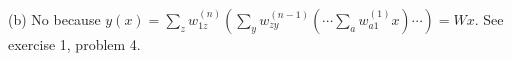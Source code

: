 \begin{enumerate}
\begin{solution}
    \vspace{0.5cm}
    (b) No because $y(x)=\sum_z w_{1z}^{(n)}\left(\sum_y
      w_{zy}^{(n-1)}\left(\dotsm \sum_a w_{a1}^{(1)}x\right)\dotsm\right) = Wx$. See
    exercise 1, problem 4.

  \end{solution}



\end{enumerate}
